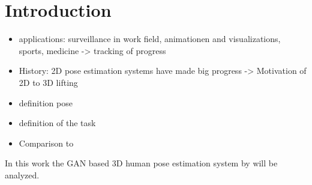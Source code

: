 \section{Introduction}


\begin{itemize}
	\item applications: surveillance in work field, animationen and visualizations, sports, medicine -> tracking of progress
	\item History: 2D pose estimation systems have made big progress -> Motivation of 2D to 3D lifting
	\item definition pose
	\item definition of the task
	\item Comparison to \citet{wandt19}
\end{itemize}

In this work the GAN based 3D human pose estimation system by \citet{drover18} will be analyzed.